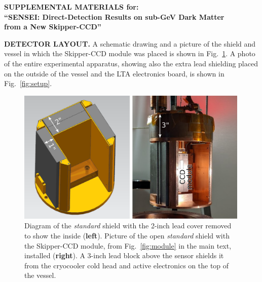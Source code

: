 \documentclass[aps,prl,twocolumn,showpacs,superscriptaddress,preprintnumbers]{revtex4-1}
\begin{document}
\begin{center}
    \begin{large} \textbf{SUPPLEMENTAL MATERIALS for:\\
``SENSEI: Direct-Detection Results on sub-GeV Dark Matter \\ from a New Skipper-CCD''}
    \end{large}
\end{center}

\noindent\textbf{DETECTOR LAYOUT.}
A schematic drawing and a picture of the shield and vessel in which the Skipper-CCD module was placed is shown in Fig.~\ref{fig:innerShield}.  A photo of the entire experimental apparatus, showing also the extra lead shielding placed on the outside of the vessel and the LTA electronics board, is shown in Fig.~\ref{fig:setup}. 
\vskip 3mm

\begin{figure}[b!]
\begin{center}
\includegraphics[width=0.99\textwidth]{innerShield.pdf}
\caption{Diagram of the {\it standard} shield with the 2-inch lead cover removed to show the inside (\textbf{left}). Picture of the open {\it standard} shield with the Skipper-CCD module, from Fig.~\ref{fig:module} in the main text, installed (\textbf{right}). A 3-inch lead block above the sensor shields it from the cryocooler cold head and active electronics on the top of the vessel.}
\label{fig:innerShield}
\end{center}
\end{figure}
\end{document}
